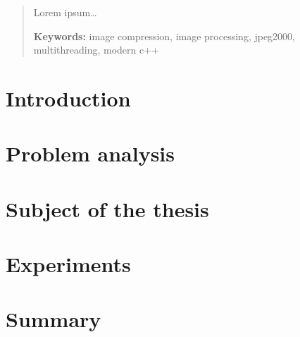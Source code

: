 \documentclass[12pt, twoside, a4paper, openright]{report}
\begin{document}


\cleardoublepage

 
\cleardoublepage



\cleardoublepage


\begin{abstract}
    Lorem ipsum\dots

    \textbf{Keywords:} image compression, image processing, jpeg2000, multithreading, modern c++ 
\end{abstract}

\tableofcontents

\newpage
{}

\chapter{Introduction} \label{ch:intro}


\chapter{Problem analysis} \label{ch:problem}


\chapter{Subject of the thesis} \label{ch:subject}


\chapter{Experiments} \label{ch:experiments}


\chapter{Summary} \label{ch:summary}

\end{document}
